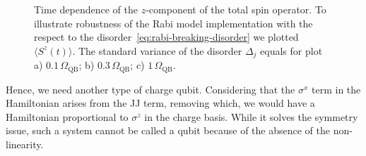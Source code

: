 \documentclass[reprint, aps, prx, amsmath, amssymb, longbibliography, superscriptaddress]{revtex4-2}
\begin{document}
\begin{figure}[th]
    \captionsetup[subfloat]{captionskip=-135pt} %
    \centering
    \caption{Time dependence of the $z$-component of the total spin operator. To illustrate robustness of the Rabi model implementation with the respect to the disorder~\eqref{eq:rabi-breaking-disorder} we plotted $\langle S^z(t) \rangle$. The standard variance of the disorder $\Delta_j$  equals for plot a) $ 0.1\, \Omega_{\text{QB}}$; b) $0.3\,\Omega_{\text{QB}}$; c) $1\,\Omega_{\text{QB}}$.}
    \label{fig:spin-excitation-plot}
\end{figure}



Hence, we need another type of charge qubit. Considering that the $\sigma^x$ term in the Hamiltonian arises from the JJ term, removing which, we would have a Hamiltonian proportional to $\sigma^z$ in the charge basis. While it solves the symmetry issue, such a system cannot be called a qubit because of the absence of the non-linearity.
\end{document}
